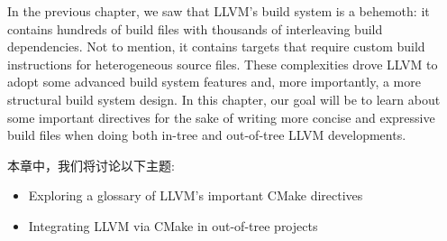 In the previous chapter, we saw that LLVM's build system is a behemoth: it contains hundreds of build files with thousands of interleaving build dependencies. Not to mention, it contains targets that require custom build instructions for heterogeneous source files. These complexities drove LLVM to adopt some advanced build system features and, more importantly, a more structural build system design. In this chapter, our goal will be to learn about some important directives for the sake of writing more concise and expressive build files when doing both in-tree and out-of-tree LLVM developments.

本章中，我们将讨论以下主题:

\begin{itemize}
	\item Exploring a glossary of LLVM's important CMake directives
	\item Integrating LLVM via CMake in out-of-tree projects
\end{itemize}
